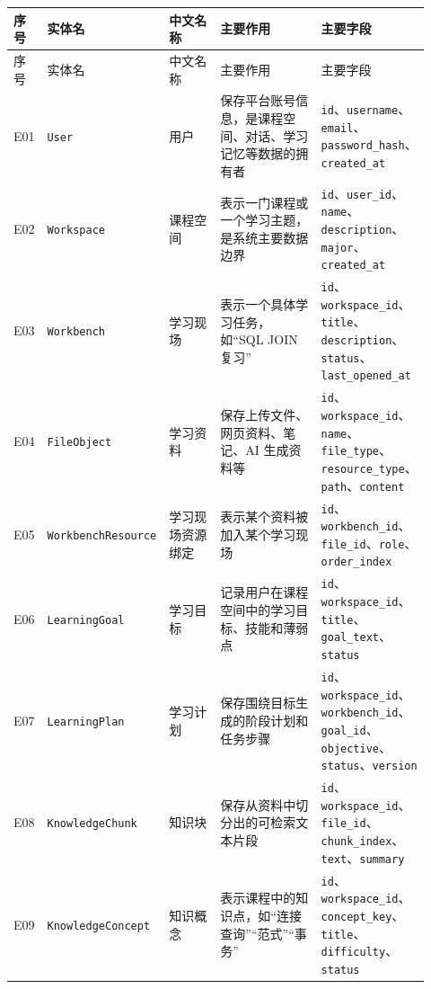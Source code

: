 \documentclass[10pt,a4paper,fontset=none]{ctexart}
\begin{document}
\begingroup\scriptsize
\renewcommand{\arraystretch}{1.18}
\setlength{\LTleft}{0pt}
\setlength{\LTright}{0pt}
\begin{longtable}{>{\raggedright\arraybackslash}p{0.08\linewidth}>{\raggedright\arraybackslash}p{0.18\linewidth}>{\raggedright\arraybackslash}p{0.18\linewidth}>{\raggedright\arraybackslash}p{0.34\linewidth}>{\raggedright\arraybackslash}p{0.14\linewidth}}
\toprule
序号 & 实体名 & 中文名称 & 主要作用 & 主要字段 \\
\midrule
\endfirsthead
\toprule
序号 & 实体名 & 中文名称 & 主要作用 & 主要字段 \\
\midrule
\endhead
E01 & \texttt{User} & 用户 & 保存平台账号信息，是课程空间、对话、学习记忆等数据的拥有者 & \texttt{id}、\texttt{username}、\texttt{email}、\texttt{password\_hash}、\texttt{created\_at} \\
E02 & \texttt{Workspace} & 课程空间 & 表示一门课程或一个学习主题，是系统主要数据边界 & \texttt{id}、\texttt{user\_id}、\texttt{name}、\texttt{description}、\texttt{major}、\texttt{created\_at} \\
E03 & \texttt{Workbench} & 学习现场 & 表示一个具体学习任务，如“SQL JOIN 复习” & \texttt{id}、\texttt{workspace\_id}、\texttt{title}、\texttt{description}、\texttt{status}、\texttt{last\_opened\_at} \\
E04 & \texttt{FileObject} & 学习资料 & 保存上传文件、网页资料、笔记、AI 生成资料等 & \texttt{id}、\texttt{workspace\_id}、\texttt{name}、\texttt{file\_type}、\texttt{resource\_type}、\texttt{path}、\texttt{content} \\
E05 & \texttt{WorkbenchResource} & 学习现场资源绑定 & 表示某个资料被加入某个学习现场 & \texttt{id}、\texttt{workbench\_id}、\texttt{file\_id}、\texttt{role}、\texttt{order\_index} \\
E06 & \texttt{LearningGoal} & 学习目标 & 记录用户在课程空间中的学习目标、技能和薄弱点 & \texttt{id}、\texttt{workspace\_id}、\texttt{title}、\texttt{goal\_text}、\texttt{status} \\
E07 & \texttt{LearningPlan} & 学习计划 & 保存围绕目标生成的阶段计划和任务步骤 & \texttt{id}、\texttt{workspace\_id}、\texttt{workbench\_id}、\texttt{goal\_id}、\texttt{objective}、\texttt{status}、\texttt{version} \\
E08 & \texttt{KnowledgeChunk} & 知识块 & 保存从资料中切分出的可检索文本片段 & \texttt{id}、\texttt{workspace\_id}、\texttt{file\_id}、\texttt{chunk\_index}、\texttt{text}、\texttt{summary} \\
E09 & \texttt{KnowledgeConcept} & 知识概念 & 表示课程中的知识点，如“连接查询”“范式”“事务” & \texttt{id}、\texttt{workspace\_id}、\texttt{concept\_key}、\texttt{title}、\texttt{difficulty}、\texttt{status} \\

\end{longtable}
\end{document}
